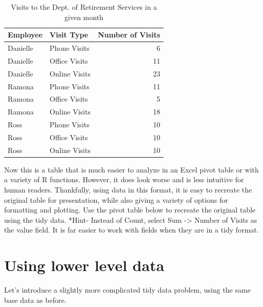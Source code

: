 \documentclass[]{book}
\begin{document}
\begin{table}

\caption{\label{tab:unnamed-chunk-3}Visits to the Dept. of Retirement Services in a given month}
\centering
\begin{tabular}[t]{l|l|r}
\hline
Employee & Visit Type & Number of Visits\\
\hline
Danielle & Phone Visits & 6\\
\hline
Danielle & Office Visits & 11\\
\hline
Danielle & Online Visits & 23\\
\hline
Ramona & Phone Visits & 11\\
\hline
Ramona & Office Visits & 5\\
\hline
Ramona & Online Visits & 18\\
\hline
Ross & Phone Visits & 10\\
\hline
Ross & Office Visits & 10\\
\hline
Ross & Online Visits & 10\\
\hline
\end{tabular}
\end{table}

Now this is a table that is much easier to analyze in an Excel pivot table or with a variety of R functions. However, it does look worse and is less intuitive for human readers. Thankfully, using data in this format, it is easy to recreate the original table for presentation, while also giving a variety of options for formatting and plotting. Use the pivot table below to recreate the original table using the tidy data. *Hint- Instead of Count, select Sum -\textgreater{} Number of Visits as the value field. It is far easier to work with fields when they are in a tidy format.

\hypertarget{using-lower-level-data}{%
\section{Using lower level data}\label{using-lower-level-data}}

Let's introduce a slightly more complicated tidy data problem, using the same base data as before.
\end{document}
